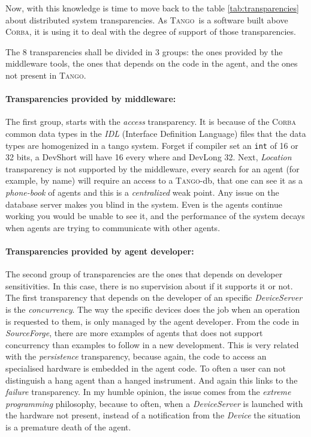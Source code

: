 \documentclass[10pt,a4paper,twoside]{llncs}
\newcommand{\tango}{\textsc{Tango}}
\newcommand{\corba}{\textsc{Corba}}
\begin{document}
Now, with this knowledge is time to move back to the table \ref{tab:transparencies} about distributed system transparencies. As \tango\, is a software built above \corba, it is using it to deal with the degree of support of those transparencies.

The 8 transparencies shall be divided in 3 groups: the ones provided by the middleware tools, the ones that depends on the code in the agent, and the ones not present in \tango.

\paragraph{Transparencies provided by middleware:} The first group, starts with the \emph{access} transparency. It is because of the \corba\, common data types in the \emph{IDL} (Interface Definition Language) files that the data types are homogenized in a tango system. Forget if compiler set an \texttt{int} of 16 or 32 bits, a DevShort will have 16 every where and DevLong 32. Next, \emph{Location} transparency is not supported by the middleware, every search for an agent (for example, by name) will require an access to a \tango-db, that one can see it as a \emph{phone-book} of agents and this is a \emph{centralized} weak point. Any issue on the database server makes you blind in the system. Even is the agents continue working you would be unable to see it, and the performance of the system decays when agents are trying to communicate with other agents.

\paragraph{Transparencies provided by agent developer:} The second group of transparencies are the ones that depends on developer sensitivities. In this case, there is no supervision about if it supports it or not. The first transparency that depends on the developer of an specific \emph{DeviceServer} is the \emph{concurrency}. The way the specific devices does the job when an operation is requested to them, is only managed by the agent developer. From the code in \emph{SourceForge}, there are more examples of agents that does not support concurrency than examples to follow in a new development. This is very related with the \emph{persistence} transparency, because again, the code to access an specialised hardware is embedded in the agent code. To often a user can not distinguish a hang agent than a hanged instrument. And again this links to the \emph{failure} transparency. In my humble opinion, the issue comes from the \emph{extreme programming} philosophy, because to often, when a \emph{DeviceServer} is 
launched with the hardware not present, instead of a notification from the \emph{Device} the situation is a premature death of the agent.
\end{document}
